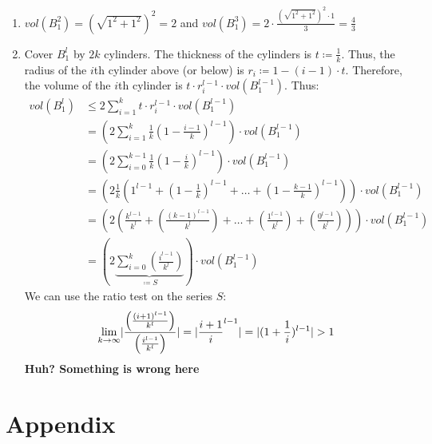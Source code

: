 \documentclass[12pt]{article}
\DeclarePairedDelimiter\abs{\lvert}{\rvert}
\begin{document}
\begin{enumerate}[label=(\alph*)]
	\item	$vol(B_1^2) = (\sqrt{1^2+1^2})^2 = 2$ and $vol(B_1^3) = 2 \cdot \frac{(\sqrt{1^2+1^2})^2 \cdot 1}{3} = \frac{4}{3}$
	\item	Cover $B_1^l$ by $2k$ cylinders. The thickness of the cylinders is $t \coloneqq \frac{1}{k}$. Thus, the radius of the $i$th cylinder above (or below) is $r_i \coloneqq 1 - (i-1) \cdot t$. Therefore, the volume of the $i$th cylinder is $t \cdot r_i^{l-1} \cdot vol(B_1^{l-1})$. Thus:
			\begin{align*}
				vol(B_1^l) &\leq 2 \sum_{i=1}^k t \cdot r_i^{l-1} \cdot vol(B_1^{l-1}) \\
				&= \left( 2 \sum_{i=1}^k \frac{1}{k} \left( 1 - \frac{i-1}{k} \right) ^ {l-1} \right) \cdot vol(B_1^{l-1}) \\
				&= \left( 2 \sum_{i=0}^{k-1} \frac{1}{k} \left( 1 - \frac{i}{k} \right) ^ {l-1} \right) \cdot vol(B_1^{l-1}) \\
				&= \left( 2 \frac{1}{k} \left( 1^{l-1} + (1 - \frac{1}{k})^{l-1} + \dots + (1 - \frac{k-1}{k})^{l-1} \right) \right) \cdot vol(B_1^{l-1}) \\
				&= \left( 2 \left( \frac{k^{l-1}}{k^l} + (\frac{(k-1)^{l-1}}{k^l}) + \dots + (\frac{1^{l-1}}{k^l}) + (\frac{0^{l-1}}{k^l}) \right) \right) \cdot vol(B_1^{l-1}) \\
				&= \left( 2 \underbrace{\sum_{i=0}^{k} \left( \frac{i^{l-1}}{k^l} \right)}_{\coloneqq S} \right) \cdot vol(B_1^{l-1})
			\end{align*}
			We can use the ratio test on the series $S$:
			\begin{align*}
				\lim_{k \rightarrow \infty} \abs{\frac{\left( \frac{(i + 1)^{l-1}}{k^l} \right)}{\left( \frac{i^{l-1}}{k^l} \right)}} = \abs{\frac{i+1}{i} ^ {l-1}} = \abs{(1 + \frac{1}{i}) ^ {l-1}} > 1
			\end{align*}
			\textbf{Huh? Something is wrong here}
\end{enumerate}

\section*{Appendix}\label{appendix}
\end{document}
